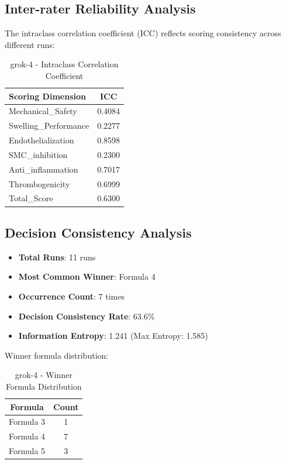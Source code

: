 \documentclass[12pt,a4paper]{article}
\begin{document}
\subsection{Inter-rater Reliability Analysis}

The intraclass correlation coefficient (ICC) reflects scoring consistency across different runs:

\begin{table}[H]
\centering
\caption{grok-4 - Intraclass Correlation Coefficient}
\begin{tabular}{lc}
\toprule
\textbf{Scoring Dimension} & \textbf{ICC} \\
\midrule
Mechanical\_Safety & 0.4084 \\
Swelling\_Performance & 0.2277 \\
Endothelialization & 0.8598 \\
SMC\_inhibition & 0.2300 \\
Anti\_inflammation & 0.7017 \\
Thrombogenicity & 0.6999 \\
Total\_Score & 0.6300 \\
\bottomrule
\end{tabular}
\end{table}

\subsection{Decision Consistency Analysis}


\begin{itemize}
    \item \textbf{Total Runs}: 11 runs
    \item \textbf{Most Common Winner}: Formula 4
    \item \textbf{Occurrence Count}: 7 times
    \item \textbf{Decision Consistency Rate}: 63.6\%
    \item \textbf{Information Entropy}: 1.241 (Max Entropy: 1.585)
\end{itemize}

Winner formula distribution:

\begin{table}[H]
\centering
\caption{grok-4 - Winner Formula Distribution}
\begin{tabular}{cc}
\toprule
\textbf{Formula} & \textbf{Count} \\
\midrule
Formula 3 & 1 \\
Formula 4 & 7 \\
Formula 5 & 3 \\
\bottomrule
\end{tabular}
\end{table}
\end{document}
